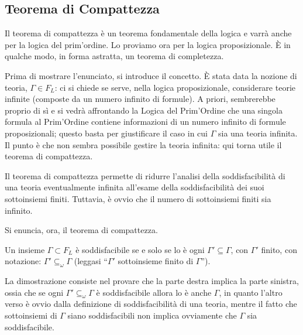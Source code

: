\subsection{Teorema di Compattezza}
Il teorema di compattezza è un teorema fondamentale della logica e varrà 
anche per la logica del prim'ordine. Lo proviamo ora per la logica proposizionale. 
\`E in qualche modo, in forma astratta, un teorema di completezza. 

Prima di mostrare l'enunciato, si introduce il concetto. \`E stata data la 
nozione di teoria, $\Gamma \in F_L$: ci si chiede se serve, nella logica 
proposizionale, considerare teorie infinite (composte da un numero 
infinito di formule). A priori, sembrerebbe proprio di sì e si vedrà affrontando
la Logica del Prim'Ordine che una singola formula al Prim'Ordine contiene informazioni 
di un numero infinito di formule proposizionali; questo basta per giustificare il caso 
in cui $\Gamma$ sia una teoria infinita. Il punto è che non sembra possibile 
gestire la teoria infinita: qui torna utile il teorema di compattezza. 
 

Il teorema di compattezza permette di ridurre l'analisi della soddisfacibilità di 
una teoria eventualmente infinita all'esame della soddisfacibilità dei suoi 
sottoinsiemi finiti. Tuttavia, è ovvio che il numero di sottoinsiemi finiti 
sia infinito. 
\noindent

Si enuncia, ora, il teorema di compattezza.
\begin{teo}[Compattezza]
Un insieme $\Gamma \subset F_L$ è soddisfacibile se e solo se lo è ogni
$\Gamma' \subseteq \Gamma$, con $\Gamma'$ finito, con notazione: $\Gamma' \subseteq_{\omega} \Gamma$ (leggasi 
``$\Gamma '$ sottoinsieme finito di $\Gamma$'').
\end{teo}
La dimostrazione consiste nel 
provare che la parte destra implica la parte sinistra, ossia 
che se ogni $\Gamma ' \subseteq_{\omega} \Gamma$ è 
soddisfacibile allora lo è anche $\Gamma$, in quanto l'altro 
verso è ovvio dalla definizione di soddisfacibilità di una teoria, mentre
il fatto che sottoinsiemi di $\Gamma$ siano soddisfacibili non implica ovviamente 
che $\Gamma$ sia soddisfacibile. 

